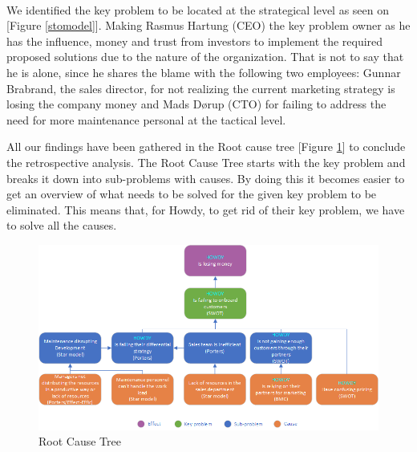 \paragraph{}

We identified the key problem to be located at the strategical level as seen on [Figure \ref{stomodel}]. Making Rasmus Hartung (CEO) the key problem owner as he has the influence, money and trust from investors to implement the required proposed solutions due to the nature of the organization. That is not to say that he is alone, since he shares the blame with the following two employees: Gunnar Brabrand, the sales director, for not realizing the current marketing strategy is losing the company money and Mads Dørup (CTO) for failing to address the need for more maintenance personal at the tactical level.\newline


\noindent All our findings have been gathered in the Root cause tree [Figure \ref{rootcausetree}] to conclude the retrospective analysis. The Root Cause Tree starts with the key problem and breaks it down into sub-problems with causes. By doing this it becomes easier to get an overview of what needs to be solved for the given key problem to be eliminated. This means that, for Howdy, to get rid of their key problem, we have to solve all the causes. 

\begin{figure}[H]
\centering
\includegraphics[scale=0.73]{figures/rootcause.png}
\caption{Root Cause Tree}
\label{rootcausetree}
\end{figure}
